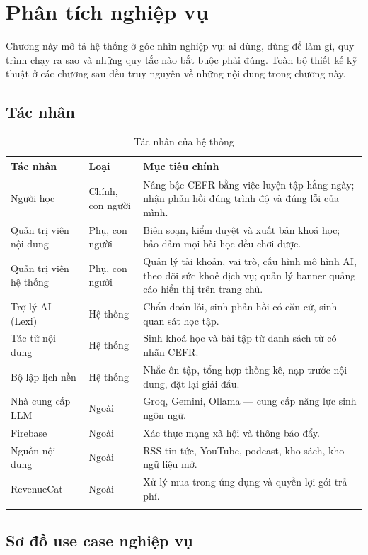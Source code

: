 \chapter{Phân tích nghiệp vụ}

Chương này mô tả hệ thống ở góc nhìn nghiệp vụ: ai dùng, dùng để làm gì, quy trình chạy ra
sao và những quy tắc nào bắt buộc phải đúng. Toàn bộ thiết kế kỹ thuật ở các chương sau
đều truy nguyên về những nội dung trong chương này.

\section{Tác nhân}

\begin{longtable}{L{3.0cm} L{3.0cm} L{7.6cm}}
\toprule
\textbf{Tác nhân} & \textbf{Loại} & \textbf{Mục tiêu chính}\\
\midrule
\endhead
Người học & Chính, con người & Nâng bậc CEFR bằng việc luyện tập hằng ngày; nhận phản hồi đúng trình độ và đúng lỗi của mình.\\
Quản trị viên nội dung & Phụ, con người & Biên soạn, kiểm duyệt và xuất bản khoá học; bảo đảm mọi bài học đều chơi được.\\
Quản trị viên hệ thống & Phụ, con người & Quản lý tài khoản, vai trò, cấu hình mô hình AI, theo dõi sức khoẻ dịch vụ; quản lý banner quảng cáo hiển thị trên trang chủ.\\
Trợ lý AI (Lexi) & Hệ thống & Chẩn đoán lỗi, sinh phản hồi có căn cứ, sinh quan sát học tập.\\
Tác tử nội dung & Hệ thống & Sinh khoá học và bài tập từ danh sách từ có nhãn CEFR.\\
Bộ lập lịch nền & Hệ thống & Nhắc ôn tập, tổng hợp thống kê, nạp trước nội dung, đặt lại giải đấu.\\
Nhà cung cấp LLM & Ngoài & Groq, Gemini, Ollama — cung cấp năng lực sinh ngôn ngữ.\\
Firebase & Ngoài & Xác thực mạng xã hội và thông báo đẩy.\\
Nguồn nội dung & Ngoài & RSS tin tức, YouTube, podcast, kho sách, kho ngữ liệu mở.\\
RevenueCat & Ngoài & Xử lý mua trong ứng dụng và quyền lợi gói trả phí.\\
\bottomrule
\caption{Tác nhân của hệ thống}
\end{longtable}

\section{Sơ đồ use case nghiệp vụ}

